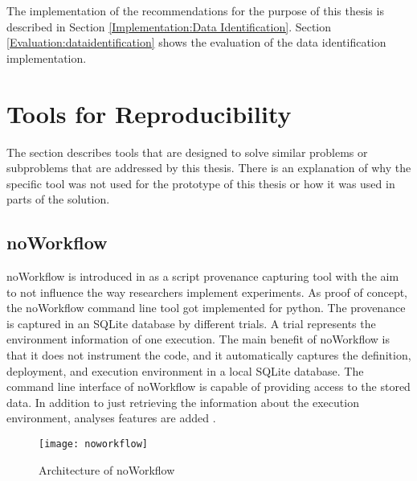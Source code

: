 \documentclass[draft,final]{vutinfth} %
\begin{document}
The implementation of the recommendations for the purpose of this thesis is described in Section \ref{Implementation:Data Identification}. Section \ref{Evaluation:dataidentification} shows the evaluation of the data identification implementation. 

\section{Tools for Reproducibility}\label{Existing Tools}
The section describes tools that are designed to solve similar problems or subproblems that are addressed by this thesis. There is an explanation of why the specific tool was not used for the prototype of this thesis or how it was used in parts of the solution. 

\subsection{noWorkflow}\label{Noworkflow}
noWorkflow is introduced in \cite{c9e0604becba42af96a9cb0a6f60018b} as a script provenance capturing tool with the aim to not influence the way researchers implement experiments. As proof of concept, the noWorkflow command line tool got implemented for python. The provenance is captured in an SQLite database by different trials. A trial represents the environment information of one execution. The main benefit of noWorkflow is that it does not instrument the code, and it automatically captures the definition, deployment, and execution environment in a local SQLite database.  The command line interface of noWorkflow is capable of providing access to the stored data. In addition to just retrieving the information about the execution environment, analyses features are added \cite{c9e0604becba42af96a9cb0a6f60018b}.

\begin{figure}[h]
	\centering
	\texttt{[image: noworkflow]}
	\caption{Architecture of noWorkflow \cite{c9e0604becba42af96a9cb0a6f60018b}}
	\label{fig:noworkflow} %
\end{figure}
\end{document}
